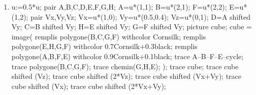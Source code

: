 \begin{exercice*}
\begin{multicols}{2}
\begin{enumerate}
            \begin{Geometrie}[CoinHD={(5u,4u)}]
                u:=0.5*u;
                pair A,B,C,D,E,F,G,H;
                A=u*(1,1);
                B=u*(2,1);
                F=u*(2,2);
                E=u*(1,2);
                pair Vx,Vy,Vz;
                Vx=u*(1,0);
                Vy=u*(0.5,0.4);
                Vz=u*(0,1);
                D=A shifted Vy;
                C=B shifted Vy;
                H=E shifted Vy;
                G=F shifted Vy;
                picture cube;
                cube = image(
                    remplis polygone(B,C,G,F) withcolor Cornsilk;
                    remplis polygone(E,H,G,F) withcolor 0.7Cornsilk+0.3black;
                    remplis polygone(A,B,F,E) withcolor 0.9Cornsilk+0.1black;
                    trace A--B--F--E--cycle;
                    trace polygone(B,C,G,F);
                    trace chemin(G,H,E);
                );        
                trace cube;
                trace cube shifted (Vx+Vy);
                trace cube shifted (Vx);
                trace cube shifted (Vx+Vy+Vz);
                trace cube shifted (Vx+Vy+2*Vz);
                trace cube shifted (2*Vx+Vy);
                trace cube shifted (3*Vx+Vy);
                trace cube shifted (3*Vx);
            \end{Geometrie}
            \item
            \begin{Geometrie}[CoinHD={(5u,4u)}]
                u:=0.5*u;
                pair A,B,C,D,E,F,G,H;
                A=u*(1,1);
                B=u*(2,1);
                F=u*(2,2);
                E=u*(1,2);
                pair Vx,Vy,Vz;
                Vx=u*(1,0);
                Vy=u*(0.5,0.4);
                Vz=u*(0,1);
                D=A shifted Vy;
                C=B shifted Vy;
                H=E shifted Vy;
                G=F shifted Vy;
                picture cube;
                cube = image(
                    remplis polygone(B,C,G,F) withcolor Cornsilk;
                    remplis polygone(E,H,G,F) withcolor 0.7Cornsilk+0.3black;
                    remplis polygone(A,B,F,E) withcolor 0.9Cornsilk+0.1black;
                    trace A--B--F--E--cycle;
                    trace polygone(B,C,G,F);
                    trace chemin(G,H,E);
                );        
                trace cube;
                trace cube shifted (Vz);
                trace cube shifted (2*Vz);
                trace cube shifted (Vx+Vy);
                trace cube shifted (Vx);
                trace cube shifted (2*Vx+Vy);

\end{Geometrie}
\end{enumerate}
\end{multicols}
\end{exercice*}
